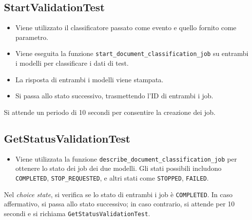 \subsection{StartValidationTest}
\begin{itemize}
  \item Viene utilizzato il classificatore passato come evento e quello fornito come parametro.
  \item Viene eseguita la funzione \texttt{start\_document\_classification\_job} su entrambi i modelli per classificare i dati di test.
  \item La risposta di entrambi i modelli viene stampata.
  \item Si passa allo stato successivo, trasmettendo l'ID di entrambi i job.
\end{itemize}
Si attende un periodo di 10 secondi per consentire la creazione dei job.

\subsection{GetStatusValidationTest}
\begin{itemize}
  \item Viene utilizzata la funzione \texttt{describe\_document\_classification\_job} per ottenere lo stato dei job dei due modelli. Gli stati possibili includono \texttt{COMPLETED}, \texttt{STOP\_REQUESTED}, e altri stati come \texttt{STOPPED}, \texttt{FAILED}.
\end{itemize}
Nel \textit{choice state}, si verifica se lo stato di entrambi i job è \texttt{COMPLETED}. In caso affermativo, si passa allo stato successivo; in caso contrario, si attende per 10 secondi e si richiama \texttt{GetStatusValidationTest}.

